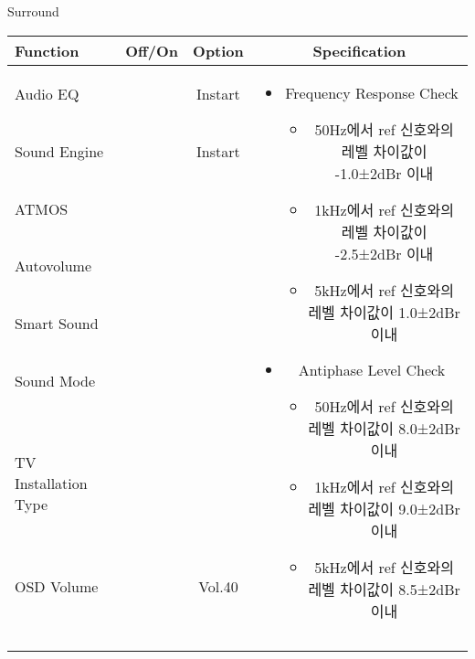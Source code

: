 \begin{frame}[t]{Surround}
\begin{tiny}
\begin{tabular}{@{}lccc@{}}
\toprule
Function & Off/On & Option & Specification \\
\midrule
Audio EQ & \color{black}{Off} & Instart &
\multirow{10}{60mm}{
\begin{itemize}\vspace{-3mm}
\item Frequency Response Check
	\begin{itemize}
		\item 50Hz에서 ref 신호와의 레벨 차이값이 -1.0±2dBr 이내
		\item 1kHz에서 ref 신호와의 레벨 차이값이 -2.5±2dBr 이내
		\item 5kHz에서 ref 신호와의 레벨 차이값이 1.0±2dBr 이내	
	\end{itemize}
\item Antiphase Level Check
	\begin{itemize}
		\item 50Hz에서 ref 신호와의 레벨 차이값이 8.0±2dBr 이내
		\item 1kHz에서 ref 신호와의 레벨 차이값이 9.0±2dBr 이내
		\item 5kHz에서 ref 신호와의 레벨 차이값이 8.5±2dBr 이내
	\end{itemize}
\end{itemize}
} \\
Sound Engine & \color{blue}{On} & Instart & \\
ATMOS & \color{black}{Off}  & & \\
Autovolume & \color{black}{Off} & & \\
Smart Sound & \color{black}{Off} & & \\
Sound Mode & \color{blue}{On} & \color{blue}{Surround} & \\
TV Installation Type & \color{blue}{On} & \color{black}{Standtype1} & \\
OSD Volume & \color{blue}{On} & Vol.40 & \\
& & & \\
& & & \\
& & & \\
& & & \\
\midrule
\end{tabular}
\end{tiny}


\end{frame}
